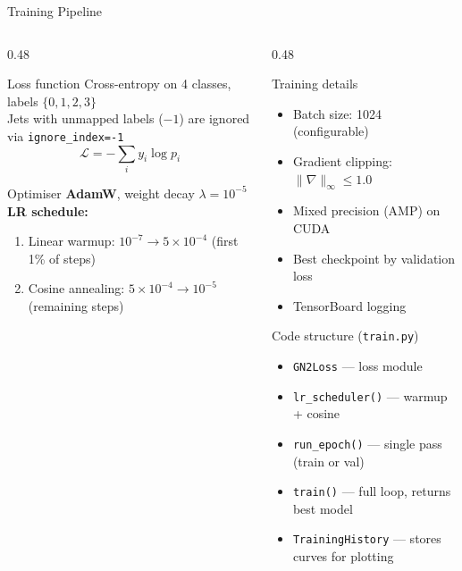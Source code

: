 \documentclass[aspectratio=169, 10pt]{beamer}
\begin{document}
\begin{frame}{Training Pipeline}
\begin{columns}[T]
  \begin{column}{0.48\textwidth}
    \begin{block}{Loss function}
      Cross-entropy on 4 classes, labels $\{0,1,2,3\}$\\
      Jets with unmapped labels ($-1$) are ignored via
      \texttt{ignore\_index=-1}
      \[
        \mathcal{L} = -\sum_{i} y_i \log p_i
      \]
    \end{block}
    \begin{block}{Optimiser}
      \textbf{AdamW}, weight decay $\lambda = 10^{-5}$\\[3pt]
      \textbf{LR schedule:}
      \begin{enumerate}
        \item Linear warmup: $10^{-7} \to 5\times10^{-4}$ (first 1\% of steps)
        \item Cosine annealing: $5\times10^{-4} \to 10^{-5}$ (remaining steps)
      \end{enumerate}
    \end{block}
  \end{column}
  \begin{column}{0.48\textwidth}
    \begin{block}{Training details}
      \begin{itemize}
        \item Batch size: 1024 (configurable)
        \item Gradient clipping: $\|\nabla\|_\infty \le 1.0$
        \item Mixed precision (AMP) on CUDA
        \item Best checkpoint by validation loss
        \item TensorBoard logging
      \end{itemize}
    \end{block}
    \begin{block}{Code structure (\texttt{train.py})}
      \begin{itemize}
        \item \texttt{GN2Loss} --- loss module
        \item \texttt{lr\_scheduler()} --- warmup + cosine
        \item \texttt{run\_epoch()} --- single pass (train or val)
        \item \texttt{train()} --- full loop, returns best model
        \item \texttt{TrainingHistory} --- stores curves for plotting
      \end{itemize}
    \end{block}
  \end{column}
\end{columns}
\end{frame}
\end{document}
